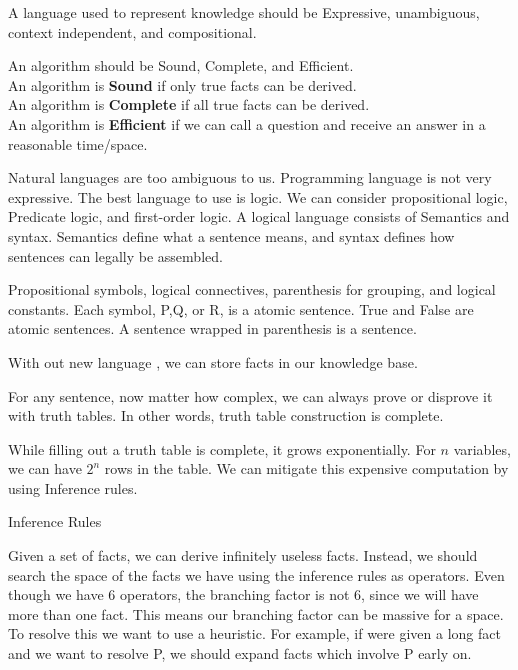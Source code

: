 \documentclass{chezarticle}
\begin{document}
\begin{definition}
A language used to represent knowledge should be Expressive, unambiguous, context independent, and compositional.
\end{definition}
\begin{definition}
An algorithm should be Sound, Complete, and Efficient.\\
An algorithm is \textbf{Sound} if only true facts can be derived.\\
An algorithm is \textbf{Complete} if all true facts can be derived.\\
An algorithm is \textbf{Efficient} if we can call a question and receive an answer in a reasonable time/space.
\end{definition}
Natural languages are too ambiguous to us. Programming language is not very expressive. The best language to use is logic. We can consider propositional logic, Predicate logic, and first-order logic. A logical language consists of Semantics and syntax. Semantics define what a sentence means, and syntax defines how sentences can legally be assembled. 
\begin{definition}
Propositional symbols, logical connectives, parenthesis for grouping, and logical constants. Each symbol, P,Q, or R, is a atomic sentence. True and False are atomic sentences. A sentence wrapped in parenthesis is a sentence. 
\end{definition}
With out new language , we can store facts in our knowledge base. 
\begin{fact}
For any sentence, now matter how complex, we can always prove or disprove it with truth tables. In other words, truth table construction is complete.
\end{fact}
While filling out a truth table is complete, it grows exponentially. For $n$ variables, we can have $2^n$ rows in the table. We can mitigate this expensive computation by using Inference rules. 
\begin{definition}
Inference Rules
\end{definition}
Given a set of facts, we can derive infinitely useless facts. Instead, we should search the space of the facts we have using the inference rules as operators. Even though we have 6 operators, the branching factor is not 6, since we will have more than one fact. This means our branching factor can be massive for a space. To resolve this we want to use a heuristic. For example, if were given a long fact and we want to resolve P, we should expand facts which involve P early on. 
\\
\end{document}
